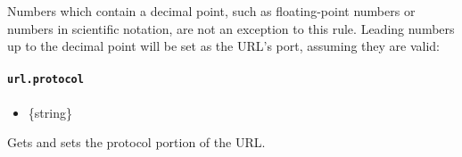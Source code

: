 \begin{Shaded}
\begin{Highlighting}[]
 \OperatorTok{=} \OperatorTok{;} 
\NormalTok{)}\OperatorTok{;}
\end{Highlighting}
\end{Shaded}

Numbers which contain a decimal point, such as floating-point numbers or
numbers in scientific notation, are not an exception to this rule.
Leading numbers up to the decimal point will be set as the URL's port,
assuming they are valid:

\begin{Shaded}
\begin{Highlighting}[]
 \OperatorTok{=} \OperatorTok{;}
\NormalTok{)}\OperatorTok{;}
\end{Highlighting}
\end{Shaded}

\paragraph{\texorpdfstring{\texttt{url.protocol}}{url.protocol}}\label{url.protocol}

\begin{itemize}
\tightlist
\item
  \{string\}
\end{itemize}

Gets and sets the protocol portion of the URL.

\begin{Shaded}
\begin{Highlighting}[]
\OperatorTok{=}  \NormalTok{(}\NormalTok{)}\OperatorTok{;}
\NormalTok{)}\OperatorTok{;}

 \OperatorTok{=} \OperatorTok{;}
\NormalTok{)}\OperatorTok{;}
\end{Highlighting}
\end{Shaded}

